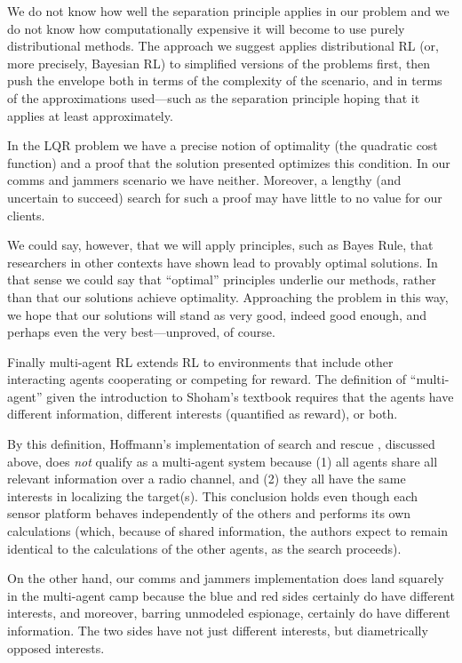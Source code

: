 \documentclass{article}
\begin{document}
We do not know how well the separation principle applies in our
problem and we do not know how computationally expensive it will
become to use purely distributional methods.  The approach we suggest
applies distributional RL (or, more precisely, Bayesian RL) to
simplified versions of the problems first, then push the envelope both
in terms of the complexity of the scenario, and in terms of the
approximations used---such as the separation principle hoping that it
applies at least approximately.

In the LQR problem we have a precise notion of optimality (the
quadratic cost function) and a proof that the solution presented
optimizes this condition.  In our comms and jammers scenario we have
neither.  Moreover, a lengthy (and uncertain to succeed) search for
such a proof may have little to no value for our clients.

We could say, however, that we will apply principles, such as Bayes
Rule, that researchers in other contexts have shown lead to provably
optimal solutions.  In that sense we could say that ``optimal''
principles underlie our methods, rather than that our solutions
achieve optimality.  Approaching the problem in this way, we hope that
our solutions will stand as very good, indeed good enough, and perhaps
even the very best---unproved, of course.

Finally multi-agent RL \cite{bucsoniu2010multi} extends RL to
environments that include other interacting agents cooperating or
competing for reward.  The definition of ``multi-agent'' given the
introduction to Shoham's textbook \cite{shoham2008multiagent} requires
that the agents have different information, different interests
(quantified as reward), or both.

By this definition, Hoffmann's implementation of search and rescue
\cite{hoffmann2009mobile}, discussed above, does \emph{not} qualify as
a multi-agent system because (1) all agents share all relevant
information over a radio channel, and (2) they all have the same
interests in localizing the target(s).  This conclusion holds even
though each sensor platform behaves independently of the others and
performs its own calculations (which, because of shared information,
the authors expect to remain identical to the calculations of the
other agents, as the search proceeds).

On the other hand, our comms and jammers implementation does land
squarely in the multi-agent camp because the blue and red sides
certainly do have different interests, and moreover, barring unmodeled
espionage, certainly do have different information.  The two sides
have not just different interests, but diametrically opposed
interests.
\end{document}
